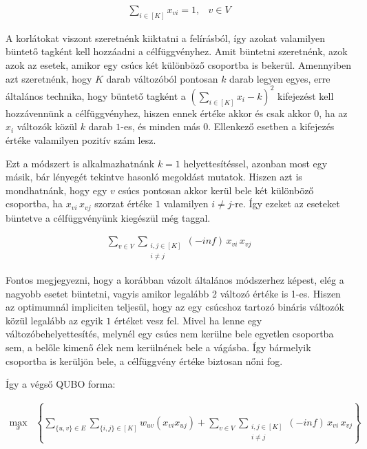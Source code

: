\begin{align}
	\sum _{i \in [K]} x_{vi} = 1, &v \in V
\end {align}

A korlátokat viszont szeretnénk kiiktatni a felírásból, így azokat valamilyen büntető tagként kell hozzáadni a célfüggvényhez. Amit büntetni szeretnénk, azok azok az esetek, amikor egy csúcs két különböző csoportba is bekerül. Amennyiben azt szeretnénk, hogy $K$ darab változóból pontosan $k$ darab legyen egyes, erre általános technika, hogy büntető tagként a $(\sum _{i \in [K]} x_i - k)^2 $ kifejezést kell hozzávennünk a célfüggvényhez, hiszen ennek értéke akkor és csak akkor $0$, ha az $x_i$ változók közül $k$ darab $1$-es, és minden más $0$. Ellenkező esetben a kifejezés értéke valamilyen pozitív szám lesz.

Ezt a módszert is alkalmazhatnánk $k=1$ helyettesítéssel, azonban most egy másik, bár lényegét tekintve hasonló megoldást mutatok. Hiszen azt is mondhatnánk, hogy egy $v$ csúcs pontosan akkor kerül bele két különböző csoportba, ha $x_{vi} \, x_{vj}$ szorzat értéke $1$ valamilyen $i \neq j$-re. Így ezeket az eseteket büntetve a célfüggvényünk kiegészül még  taggal. 

\begin{align}
	\sum _{v \in V } \sum _{\substack{ i,j \in [K] \\  i \neq j}} (-inf) \, x_{vi} \, x_{vj} \label{QUBOOnehotonlyone}
\end{align}

Fontos megjegyezni, hogy a korábban vázolt általános módszerhez képest, elég a nagyobb esetet büntetni, vagyis amikor legalább 2 változó értéke is 1-es. Hiszen az optimumnál impliciten teljesül, hogy az egy csúcshoz tartozó bináris változók közül legalább az egyik $1$ értéket vesz fel. Mivel ha lenne egy változóbehelyettesítés, melynél egy csúcs nem kerülne bele egyetlen csoportba sem, a belőle kimenő élek nem kerülnének bele a vágásba. Így bármelyik csoportba is kerüljön bele, a célfüggvény értéke biztosan nőni fog.

Így a végső QUBO forma:

\begin{align} 
	\max_{x} & \left\{ \sum _{\{{u,v}\} \in E}  \sum _{\{{i,j}\} \in [K]} w_{uv}(x_{vi}  x_{uj}) + \sum _{v \in V } \sum _{\substack{ i,j \in [K] \\  i \neq j}} (-inf) \, x_{vi} \, x_{vj}\right\} 
\end{align}




